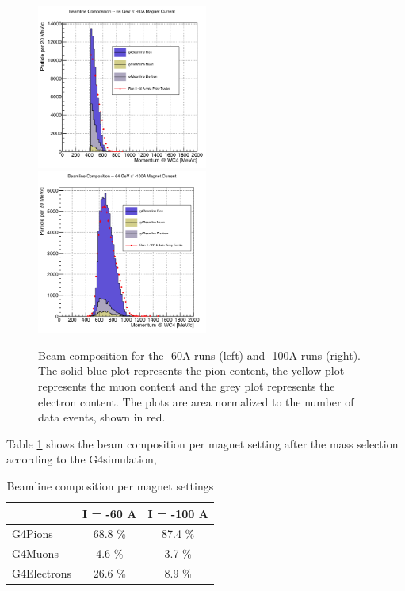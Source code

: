 \begin{figure}
\includegraphics[width=0.5\textwidth,height=\textheight,keepaspectratio]{Chapter-7/Images/Beam60A.png}
\includegraphics[width=0.5\textwidth,height=\textheight,keepaspectratio]{Chapter-7/Images/Beam100A.png}
\label{fig:BeamComposition}
\caption{Beam composition for the -60A runs (left) and -100A runs (right). The solid blue plot represents the pion content, the yellow plot represents the muon content and the grey plot represents the electron content. The plots are area normalized to the number of data events, shown in red. }
\end{figure}

Table \ref{tab:beamline} shows the beam composition per magnet setting after the mass selection according to the G4simulation, 
\begin{table}[]
\centering
\label{tab:beamline}
\begin{tabular}{|l|c|c|}
\hline
                     & I = -60 A           & I = -100 A \\ \hline
G4Pions       &   68.8 \%           &      87.4 \%        \\ \hline
G4Muons     &     4.6 \%           &        3.7 \%         \\ \hline
G4Electrons &   26.6 \%           &        8.9 \%        \\ \hline
\end{tabular}
\caption{Beamline composition per magnet settings}
\end{table}


